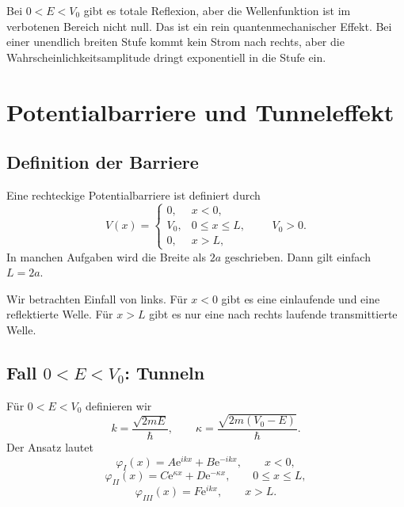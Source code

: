 \begin{conceptbox}
Bei $0<E<V_0$ gibt es totale Reflexion, aber die Wellenfunktion ist im verbotenen Bereich nicht null. Das ist ein rein quantenmechanischer Effekt. Bei einer unendlich breiten Stufe kommt kein Strom nach rechts, aber die Wahrscheinlichkeitsamplitude dringt exponentiell in die Stufe ein.
\end{conceptbox}

\section{Potentialbarriere und Tunneleffekt}

\subsection{Definition der Barriere}

Eine rechteckige Potentialbarriere ist definiert durch
\[
    V(x)=
    \begin{cases}
        0, & x<0,\\
        V_0, & 0\le x\le L,\\
        0, & x>L,
    \end{cases}
    \qquad V_0>0.
\]
In manchen Aufgaben wird die Breite als $2a$ geschrieben. Dann gilt einfach $L=2a$.

\begin{center}
\end{center}

Wir betrachten Einfall von links. Für $x<0$ gibt es eine einlaufende und eine reflektierte Welle. Für $x>L$ gibt es nur eine nach rechts laufende transmittierte Welle.

\subsection{Fall $0<E<V_0$: Tunneln}

Für $0<E<V_0$ definieren wir
\[
    k=\frac{\sqrt{2mE}}{\hbar},
    \qquad
    \kappa=\frac{\sqrt{2m(V_0-E)}}{\hbar}.
\]
Der Ansatz lautet
\[
    \varphi_I(x)=A\mathrm{e}^{ikx}+B\mathrm{e}^{-ikx},
    \qquad x<0,
\]
\[
    \varphi_{II}(x)=C\mathrm{e}^{\kappa x}+D\mathrm{e}^{-\kappa x},
    \qquad 0\le x\le L,
\]
\[
    \varphi_{III}(x)=F\mathrm{e}^{ikx},
    \qquad x>L.
\]

